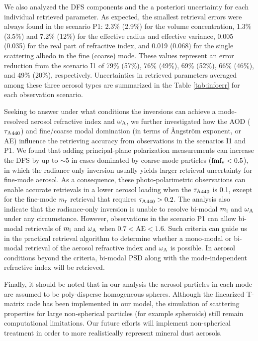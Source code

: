 We also analyzed the DFS components and the a posteriori uncertainty for
each individual retrieved parameter. As expected, the smallest retrieval
errors were always found in the scenario P1: 2.3\% (2.9\%) for the volume
concentration, 1.3\% (3.5\%) and 7.2\% (12\%) for the effective radius and
effective variance, 0.005 (0.035) for the real part of refractive index,
and 0.019 (0.068) for the single scattering albedo in the fine (coarse)
mode. These values represent an error reduction from the scenario I1 of
79\% (57\%), 76\% (49\%), 69\% (52\%), 66\% (46\%), and 49\% (20\%), respectively.
Uncertainties in retrieved parameters averaged among these three aerosol
types are summarized in the Table \ref{tab:infoerr} for each observation scenario. 

Seeking to answer under what conditions the inversions can achieve a
mode-resolved aerosol refractive index and $\omega_\text{A}$, we further investigated
how the AOD (${\tau_\text{A}}_{440}$) and fine/coarse modal domination (in terms of
Ångström exponent, or AE) influence the retrieving accuracy from
observations in the scenarios I1 and P1. We found that adding
principal-plane polarization measurements can increase the DFS by up to
$\sim$5 in cases dominated by coarse-mode particles ($\text{fmf}_\text{v}<0.5$), in which
the radiance-only inversion usually yields larger retrieval uncertainty
for fine-mode aerosol. As a consequence, these photo-polarimetric
observations can enable accurate retrievals in a lower aerosol loading
when the ${\tau_\text{A}}_{440}$ is 0.1, except for the fine-mode $m_\text{r}$ retrieval that
requires ${\tau_\text{A}}_{440}>0.2$. The analysis also indicate that the radiance-only
inversion is unable to resolve bi-modal $m_\text{i}$ and $\omega_\text{A}$ under any
circumstance. However, observations in the scenario P1 can allow
bi-modal retrievals of $m_\text{i}$ and $\omega_\text{A}$ when $0.7<\text{AE}<1.6$. 
Such criteria can guide us in the practical retrieval algorithm to determine
whether a mono-modal or bi-modal retrieval of the aerosol refractive index and
$\omega_\text{A}$ is possible. In aerosol conditions beyond the criteria, bi-modal PSD along with
the mode-independent refractive index will be retrieved. 

Finally, it should be noted that in our analysis the aerosol particles
in each mode are assumed to be poly-disperse homogeneous spheres.
Although the linearized T-matrix code has been implemented in our model,
the simulation of scattering properties for large non-spherical
particles (for example spheroids) still remain computational
limitations. Our future efforts will implement non-spherical treatment
in order to more realistically represent mineral dust aerosols.

